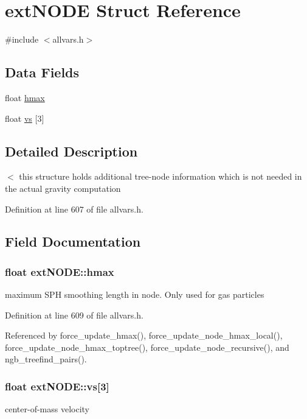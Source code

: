 \hypertarget{structextNODE}{
\section{extNODE Struct Reference}
\label{structextNODE}
}


{\ttfamily \#include $<$allvars.h$>$}

\subsection*{Data Fields}
\begin{DoxyCompactItemize}
\item 
float \hyperlink{structextNODE_ac479dcb30bffad0266b13b9200bbe9ad}{hmax}
\item 
float \hyperlink{structextNODE_a8fe64edf0e8598f60ff0ba73a04261bb}{vs} \mbox{[}3\mbox{]}
\end{DoxyCompactItemize}


\subsection{Detailed Description}
$<$ this structure holds additional tree-\/node information which is not needed in the actual gravity computation 

Definition at line 607 of file allvars.h.



\subsection{Field Documentation}
\hypertarget{structextNODE_ac479dcb30bffad0266b13b9200bbe9ad}{
\subsubsection[{hmax}]{\setlength{\rightskip}{0pt plus 5cm}float {\bf extNODE::hmax}}}
\label{structextNODE_ac479dcb30bffad0266b13b9200bbe9ad}
maximum SPH smoothing length in node. Only used for gas particles 

Definition at line 609 of file allvars.h.



Referenced by force\_\-update\_\-hmax(), force\_\-update\_\-node\_\-hmax\_\-local(), force\_\-update\_\-node\_\-hmax\_\-toptree(), force\_\-update\_\-node\_\-recursive(), and ngb\_\-treefind\_\-pairs().

\hypertarget{structextNODE_a8fe64edf0e8598f60ff0ba73a04261bb}{
\subsubsection[{vs}]{\setlength{\rightskip}{0pt plus 5cm}float {\bf extNODE::vs}\mbox{[}3\mbox{]}}}
\label{structextNODE_a8fe64edf0e8598f60ff0ba73a04261bb}
center-\/of-\/mass velocity 

